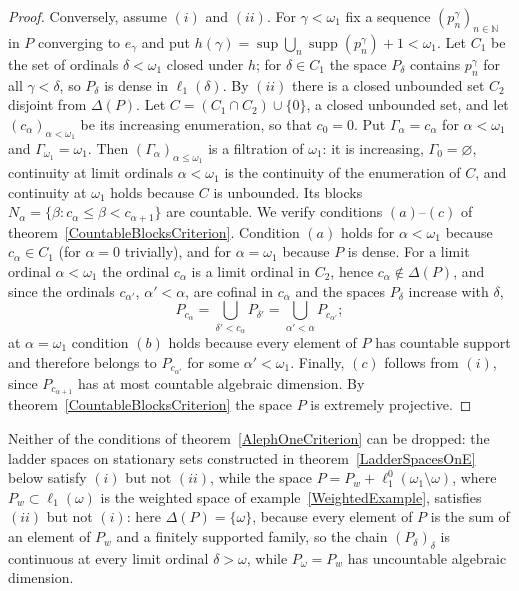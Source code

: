 \documentclass[12pt]{article}
\newcommand{\lo}[1]{\ell_1^0(#1)}
\newcommand{\ellone}[1]{\ell_1(#1)}
\newcommand{\supp}{\operatorname{supp}}
\begin{document}
\begin{proof}
    Conversely, assume $(i)$ and $(ii)$. For $\gamma<\omega_1$ fix a sequence
    ${(p^\gamma_n)}_{n\in\mathbb{N}}$ in $P$ converging to $e_\gamma$ and put
    $h(\gamma)=\sup\bigcup_n\supp(p^\gamma_n)+1<\omega_1$. Let $C_1$ be the
    set of ordinals $\delta<\omega_1$ closed under $h$; for $\delta\in C_1$
    the space $P_\delta$ contains $p^\gamma_n$ for all $\gamma<\delta$, so
    $P_\delta$ is dense in $\ellone{\delta}$. By $(ii)$ there is a closed
    unbounded set $C_2$ disjoint from $\Delta(P)$. Let $C=(C_1\cap C_2)\cup\{0\}$,
    a closed unbounded set, and let ${(c_\alpha)}_{\alpha<\omega_1}$ be its
    increasing enumeration, so that $c_0=0$. Put $\Gamma_\alpha=c_\alpha$ for
    $\alpha<\omega_1$ and $\Gamma_{\omega_1}=\omega_1$. Then
    ${(\Gamma_\alpha)}_{\alpha\leq\omega_1}$ is a filtration of $\omega_1$:
    it is increasing, $\Gamma_0=\varnothing$, continuity at limit ordinals
    $\alpha<\omega_1$ is the continuity of the enumeration of $C$, and
    continuity at $\omega_1$ holds because $C$ is unbounded. Its blocks
    $N_\alpha=\{\beta:c_\alpha\leq\beta<c_{\alpha+1}\}$ are countable. We
    verify conditions $(a)$--$(c)$ of theorem~\ref{CountableBlocksCriterion}.
    Condition $(a)$ holds for $\alpha<\omega_1$ because $c_\alpha\in C_1$ (for
    $\alpha=0$ trivially), and for $\alpha=\omega_1$ because $P$ is dense.
    For a limit ordinal $\alpha<\omega_1$ the ordinal $c_\alpha$ is a limit
    ordinal in $C_2$, hence $c_\alpha\notin\Delta(P)$, and since the ordinals
    $c_{\alpha'}$, $\alpha'<\alpha$, are cofinal in $c_\alpha$ and the
    spaces $P_\delta$ increase with $\delta$,
    \[
    P_{c_\alpha}=\bigcup_{\delta'<c_\alpha}P_{\delta'}
    =\bigcup_{\alpha'<\alpha}P_{c_{\alpha'}};
    \]
    at $\alpha=\omega_1$ condition $(b)$ holds because every element of $P$
    has countable support and therefore belongs to $P_{c_{\alpha'}}$ for some
    $\alpha'<\omega_1$. Finally, $(c)$ follows from $(i)$, since
    $P_{c_{\alpha+1}}$ has at most countable algebraic dimension. By
    theorem~\ref{CountableBlocksCriterion} the space $P$ is extremely
    projective.
\end{proof}

Neither of the conditions of theorem~\ref{AlephOneCriterion} can be dropped:
the ladder spaces on stationary sets constructed in
theorem~\ref{LadderSpacesOnE} below satisfy $(i)$ but not $(ii)$, while the
space
$P=P_w+\lo{\omega_1\setminus\omega}$, where $P_w\subset\ellone{\omega}$ is the
weighted space of example~\ref{WeightedExample}, satisfies $(ii)$ but not
$(i)$: here $\Delta(P)=\{\omega\}$, because every element of $P$ is the sum
of an element of $P_w$ and a finitely supported family, so the chain
${(P_\delta)}_\delta$ is continuous at every limit ordinal $\delta>\omega$,
while $P_\omega=P_w$ has uncountable algebraic dimension.
\end{document}
